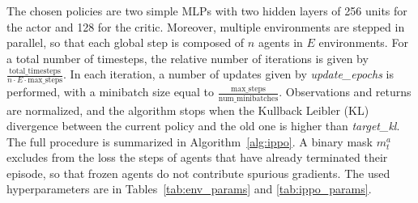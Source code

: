 The chosen policies are two simple MLPs with two hidden layers of 256 units for the actor and 128 for the critic. Moreover, multiple 
environments are stepped in parallel, so that each global step is composed of $n$ agents in $E$ environments. For a total number 
of timesteps, the relative number of iterations is given by $\frac{\text{total\_timesteps}}{n\cdot E\cdot \text{max\_steps}}$. In each iteration,
a number of updates given by \textit{update\_epochs} is performed, with a minibatch size equal to $\frac{\text{max\_steps}}{\text{num\_minibatches}}$. 
Observations and returns are normalized, and the algorithm stops when the Kullback Leibler (KL) divergence between the current policy and the old one
is higher than \textit{target\_kl}. The full procedure is summarized in Algorithm~\ref{alg:ippo}. A binary mask $m^a_t$ excludes from the loss the
steps of agents that have already terminated their episode, so that frozen agents do not contribute spurious gradients. The used hyperparameters are in Tables~\ref{tab:env_params} and \ref{tab:ippo_params}.

